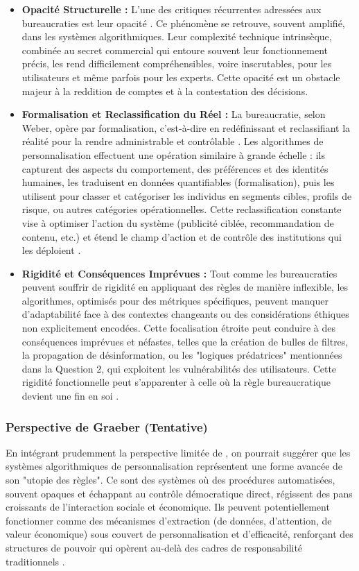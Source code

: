 \documentclass[10pt, twocolumn]{article}
\begin{document}
\begin{itemize}
    \item \textbf{Opacité Structurelle :} L'une des critiques récurrentes adressées aux bureaucraties est leur opacité \citep{Serpa2019}. Ce phénomène se retrouve, souvent amplifié, dans les systèmes algorithmiques. Leur complexité technique intrinsèque, combinée au secret commercial qui entoure souvent leur fonctionnement précis, les rend difficilement compréhensibles, voire inscrutables, pour les utilisateurs et même parfois pour les experts. Cette opacité est un obstacle majeur à la reddition de comptes et à la contestation des décisions.
    \item \textbf{Formalisation et Reclassification du Réel :} La bureaucratie, selon Weber, opère par formalisation, c'est-à-dire en redéfinissant et reclassifiant la réalité pour la rendre administrable et contrôlable \citep{Serpa2019, Weber1922}. Les algorithmes de personnalisation effectuent une opération similaire à grande échelle : ils capturent des aspects du comportement, des préférences et des identités humaines, les traduisent en données quantifiables (formalisation), puis les utilisent pour classer et catégoriser les individus en segments cibles, profils de risque, ou autres catégories opérationnelles. Cette reclassification constante vise à optimiser l'action du système (publicité ciblée, recommandation de contenu, etc.) et étend le champ d'action et de contrôle des institutions qui les déploient \citep{Weber1922}.
    \item \textbf{Rigidité et Conséquences Imprévues :} Tout comme les bureaucraties peuvent souffrir de rigidité \citep{Weber1922, Laguito2024, Hussain2019} en appliquant des règles de manière inflexible, les algorithmes, optimisés pour des métriques spécifiques, peuvent manquer d'adaptabilité face à des contextes changeants ou des considérations éthiques non explicitement encodées. Cette focalisation étroite peut conduire à des conséquences imprévues et néfastes, telles que la création de bulles de filtres, la propagation de désinformation, ou les "logiques prédatrices" mentionnées dans la Question 2, qui exploitent les vulnérabilités des utilisateurs. Cette rigidité fonctionnelle peut s'apparenter à celle où la règle bureaucratique devient une fin en soi \citep{Weber1922}.
\end{itemize}

\subsubsection{Perspective de Graeber (Tentative)}
En intégrant prudemment la perspective limitée de \citet{Graeber2015}, on pourrait suggérer que les systèmes algorithmiques de personnalisation représentent une forme avancée de son "utopie des règles". Ce sont des systèmes où des procédures automatisées, souvent opaques et échappant au contrôle démocratique direct, régissent des pans croissants de l'interaction sociale et économique. Ils peuvent potentiellement fonctionner comme des mécanismes d'extraction (de données, d'attention, de valeur économique) sous couvert de personnalisation et d'efficacité, renforçant des structures de pouvoir qui opèrent au-delà des cadres de responsabilité traditionnels \citep{Graeber2015}.
\end{document}
